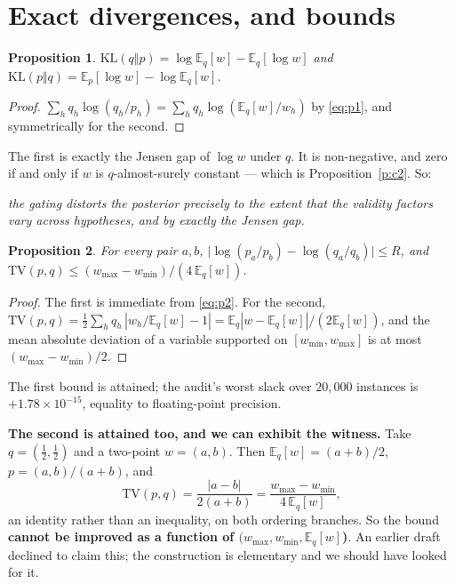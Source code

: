 \documentclass[11pt,a4paper]{article}
\newtheorem{proposition}{Proposition}
\theoremstyle{definition}
\begin{document}
\section{Exact divergences, and bounds}

\begin{proposition}\label{p:kl}
$\mathrm{KL}(q\Vert p)=\log \mathbb{E}_q[w]-\mathbb{E}_q[\log w]$ and
$\mathrm{KL}(p\Vert q)=\mathbb{E}_p[\log w]-\log \mathbb{E}_q[w]$.
\end{proposition}
\begin{proof}
$\sum_h q_h\log(q_h/p_h)=\sum_h q_h\log(\mathbb{E}_q[w]/w_h)$ by
\eqref{eq:p1}, and symmetrically for the second.
\end{proof}

The first is exactly the Jensen gap of $\log w$ under $q$. It is non-negative,
and zero if and only if $w$ is $q$-almost-surely constant --- which is
Proposition~\ref{p:c2}. So:

\begin{center}
\emph{the gating distorts the posterior precisely to the extent that the
validity factors vary across hypotheses, and by exactly the Jensen gap.}
\end{center}

\begin{proposition}\label{p:bounds}
For every pair $a,b$,
$\big|\log(p_a/p_b)-\log(q_a/q_b)\big|\le R$, and
$\mathrm{TV}(p,q)\le (w_{\max}-w_{\min})/(4\,\mathbb{E}_q[w])$.
\end{proposition}
\begin{proof}
The first is immediate from \eqref{eq:p2}. For the second,
$\mathrm{TV}(p,q)=\tfrac12\sum_h q_h\,|w_h/\mathbb{E}_q[w]-1|
=\mathbb{E}_q|w-\mathbb{E}_q[w]|/(2\mathbb{E}_q[w])$, and the mean absolute
deviation of a variable supported on $[w_{\min},w_{\max}]$ is at most
$(w_{\max}-w_{\min})/2$.
\end{proof}

The first bound is attained; the audit's worst slack over $20{,}000$ instances
is $+1.78\times10^{-15}$, equality to floating-point precision.

\textbf{The second is attained too, and we can exhibit the witness.} Take
$q=(\tfrac12,\tfrac12)$ and a two-point $w=(a,b)$. Then
$\mathbb{E}_q[w]=(a+b)/2$, $p=(a,b)/(a+b)$, and
\begin{equation}
\mathrm{TV}(p,q)=\frac{|a-b|}{2(a+b)}
=\frac{w_{\max}-w_{\min}}{4\,\mathbb{E}_q[w]},
\label{eq:tvattained}
\end{equation}
an identity rather than an inequality, on both ordering branches. So the bound
\textbf{cannot be improved as a function of $(w_{\max},w_{\min},
\mathbb{E}_q[w]$)}. An earlier draft declined to claim this; the construction
is elementary and we should have looked for it.
\end{document}
